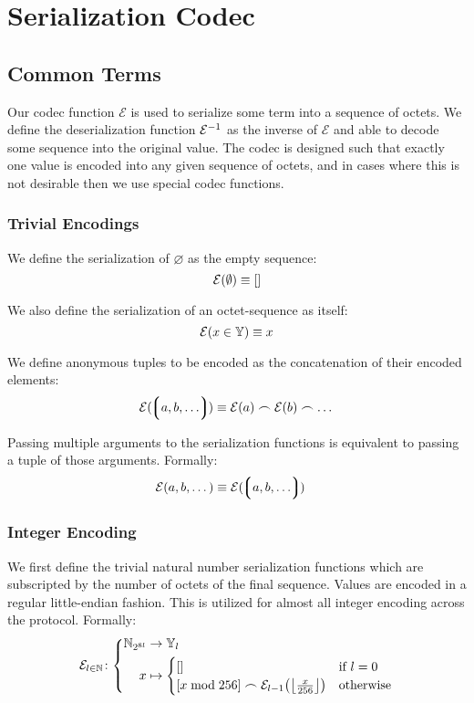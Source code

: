 \section{Serialization Codec}\label{sec:serialization}

\subsection{Common Terms}

Our codec function $\mathcal{E}$ is used to serialize some term into a sequence of octets. We define the deserialization function $\mathcal{E}^{-1}$ as the inverse of $\mathcal{E}$ and able to decode some sequence into the original value. The codec is designed such that exactly one value is encoded into any given sequence of octets, and in cases where this is not desirable then we use special codec functions.

\subsubsection{Trivial Encodings}
We define the serialization of $\varnothing$ as the empty sequence:
\begin{equation}
  \mathcal{E}(\emptyset) \equiv []
\end{equation}

We also define the serialization of an octet-sequence as itself:
\begin{equation}
  \mathcal{E}(x \in \mathbb{Y}) \equiv x
\end{equation}

We define anonymous tuples to be encoded as the concatenation of their encoded elements:
\begin{equation}
  \se(\tup{a, b, \dots}) \equiv \se(a) \concat \se(b) \concat \dots
\end{equation}

Passing multiple arguments to the serialization functions is equivalent to passing a tuple of those arguments. Formally:
\begin{align}
  \se(a, b, \dots) &\equiv \se(\tup{a, b, \dots})
\end{align}

\subsubsection{Integer Encoding}
We first define the trivial natural number serialization functions which are subscripted by the number of octets of the final sequence. Values are encoded in a regular little-endian fashion. This is utilized for almost all integer encoding across the protocol. Formally:
\begin{equation}
  \se_{l \in \N}\colon\left\{\begin{aligned}
    \N_{2^{8l}} &\to \Y_l \\
    x &\mapsto \begin{cases}
      [] &\when l = 0 \\
      [x \bmod 256] \concat \se_{l - 1}\left(\left\lfloor \frac{x}{256} \right\rfloor\right) &\otherwise
    \end{cases}
  \end{aligned}\right.
\end{equation}

